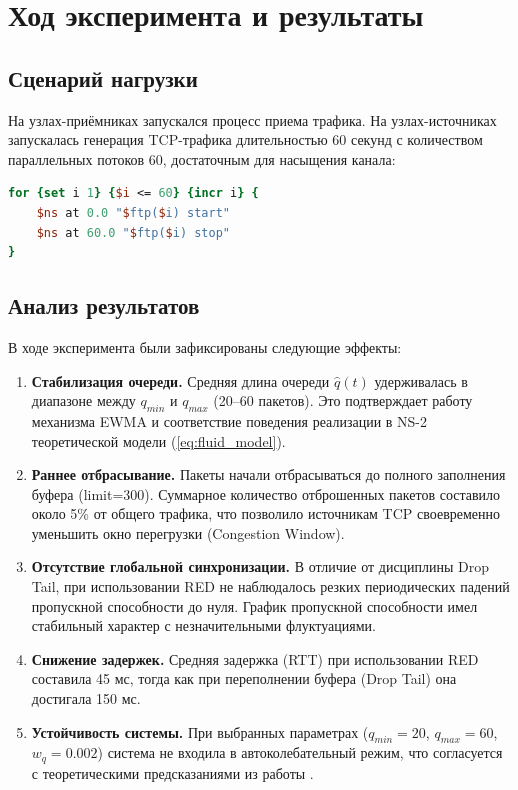 \documentclass[10pt, conference, twocolumn, a4paper]{article}
\begin{document}
\section{Ход эксперимента и результаты}
\subsection{Сценарий нагрузки}
На узлах-приёмниках запускался процесс приема трафика. На узлах-источниках запускалась генерация TCP-трафика длительностью 60 секунд с количеством параллельных потоков 60, достаточным для насыщения канала:

\begin{lstlisting}[language=tcl]
for {set i 1} {$i <= 60} {incr i} {
    $ns at 0.0 "$ftp($i) start"
    $ns at 60.0 "$ftp($i) stop"
}
\end{lstlisting}

\subsection{Анализ результатов}
В ходе эксперимента были зафиксированы следующие эффекты:

\begin{enumerate}
    \item \textbf{Стабилизация очереди.} Средняя длина очереди $\hat{q}(t)$ удерживалась в диапазоне между $q_{min}$ и $q_{max}$ (20--60 пакетов). Это подтверждает работу механизма EWMA и соответствие поведения реализации в NS-2 теоретической модели (\ref{eq:fluid_model}).
    
    \item \textbf{Раннее отбрасывание.} Пакеты начали отбрасываться до полного заполнения буфера (limit=300). Суммарное количество отброшенных пакетов составило около 5\% от общего трафика, что позволило источникам TCP своевременно уменьшить окно перегрузки (Congestion Window).
    
    \item \textbf{Отсутствие глобальной синхронизации.} В отличие от дисциплины Drop Tail, при использовании RED не наблюдалось резких периодических падений пропускной способности до нуля. График пропускной способности имел стабильный характер с незначительными флуктуациями.
    
    \item \textbf{Снижение задержек.} Средняя задержка (RTT) при использовании RED составила 45 мс, тогда как при переполнении буфера (Drop Tail) она достигала 150 мс.
    
    \item \textbf{Устойчивость системы.} При выбранных параметрах ($q_{min}=20$, $q_{max}=60$, $w_q=0.002$) система не входила в автоколебательный режим, что согласуется с теоретическими предсказаниями из работы \cite{velieva2019phd}.
\end{enumerate}
\end{document}
